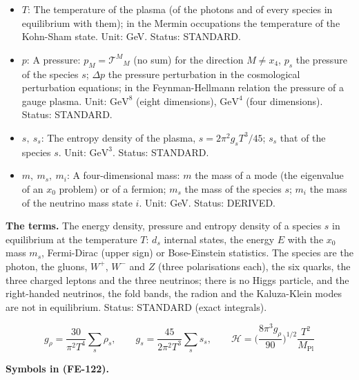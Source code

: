 \documentclass[
  10pt,
]{article}
\begin{document}
\begin{itemize}
  Value: 2.718281828. Status: STANDARD.
\item
  \(T\): The temperature of the plasma (of the photons and of every
  species in equilibrium with them); in the Mermin occupations the
  temperature of the Kohn-Sham state. Unit: GeV. Status: STANDARD.
\item
  \(p\): A pressure: \(p_M = \mathcal{T}^M{}_M\) (no sum) for the
  direction \(M \ne x_4\), \(p_s\) the pressure of the species \(s\);
  \(\Delta p\) the pressure perturbation in the cosmological
  perturbation equations; in the Feynman-Hellmann relation the pressure
  of a gauge plasma. Unit: \(\mathrm{GeV}^{8}\) (eight dimensions),
  \(\mathrm{GeV}^{4}\) (four dimensions). Status: STANDARD.
\item
  \(s,\ s_s\): The entropy density of the plasma,
  \(s = 2\pi^2g_sT^3/45\); \(s_s\) that of the species \(s\). Unit:
  \(\mathrm{GeV}^{3}\). Status: STANDARD.
\item
  \(m,\ m_s,\ m_i\): A four-dimensional mass: \(m\) the mass of a mode
  (the eigenvalue of an \(x_0\) problem) or of a fermion; \(m_s\) the
  mass of the species \(s\); \(m_i\) the mass of the neutrino mass state
  \(i\). Unit: GeV. Status: DERIVED.
\end{itemize}

\textbf{The terms.} The energy density, pressure and entropy density of
a species \(s\) in equilibrium at the temperature \(T\): \(d_s\)
internal states, the energy \(E\) with the \(x_0\) mass \(m_s\),
Fermi-Dirac (upper sign) or Bose-Einstein statistics. The species are
the photon, the gluons, \(W^+\), \(W^-\) and \(Z\) (three polarisations
each), the six quarks, the three charged leptons and the three
neutrinos; there is no Higgs particle, and the right-handed neutrinos,
the fold bands, the radion and the Kaluza-Klein modes are not in
equilibrium. Status: STANDARD (exact integrals).

\[
g_\rho = \frac{30}{\pi^2T^4}\sum_s\rho_s,\qquad g_s = \frac{45}{2\pi^2T^3}\sum_s s_s,\qquad
\mathcal{H} = \Big(\frac{8\pi^3g_\rho}{90}\Big)^{1/2}\frac{T^2}{M_{\mathrm{Pl}}} \tag{FE-122}
\]

\textbf{Symbols in (FE-122).}
\end{document}
